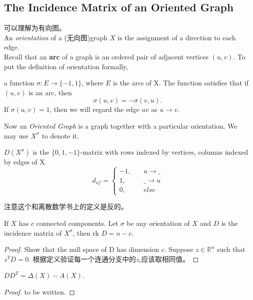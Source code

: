 \documentclass[11pt,fleqn]{book} %
\def\R{\mathbb{R}}
\begin{document}
\begin{CJK}{UTF8}{gkai}
\section{The Incidence Matrix of an Oriented Graph} 
可以理解为有向图。 \\
An \textit{orientation} of a (无向图)graph $X$ is the assignment of a direction to each edge.\\
Recall that an \textbf{arc} of a graph is an ordered pair of adjacent vertices $(u, v)$. To put the definition of orientation formally,
\begin{definition}
     a function $\sigma : E \to \{-1, 1\}$, where $E$ is the arcs of X. The function satisfies that if $(u, v)$ is an arc, then 
    \[
        \sigma (u,v) = -\sigma(v, u).\]
    If $\sigma (u,v) = 1$, then we will regard the edge $uv$ as $u \to v$.
\end{definition}

Now an \textit{Oriented Graph} is a graph together with a particular orientation. We may use $X^\sigma$ to denote it.
\begin{definition}
     $D(X^\sigma)$ is the $\{0, 1, -1\}$-matrix with rows indexed by vertices, columns indexed by edges of X. 
    \[
        d_{uf} = \begin{cases}
            -1, \quad &u \to \_ \\
            1, \quad  &\_ \to u \\
            0, \quad & else 
        \end{cases}\]
\end{definition}
\begin{remark}
    注意这个和离散数学书上的定义是反的。
\end{remark}

\begin{theorem}
    If $X$ has $c$ connected components. Let $\sigma$ be any orientation of $X$ and $D$ is the incidence matrix of $X^\sigma$, then rk $D = n - c$. 
\end{theorem}
\begin{proof}
    Show that the null space of D has dimension $c$. Suppose $z \in \R^n$ such that $z^TD = 0$. 根据定义验证每一个连通分支中的$z_i$应该取相同值。
\end{proof}
\def\x{\times}

\begin{theorem}
    $DD^T = \Delta(X) - A(X)$.
\end{theorem}
\begin{proof}
    to be written.
\end{proof}


\end{CJK}
\end{document}
